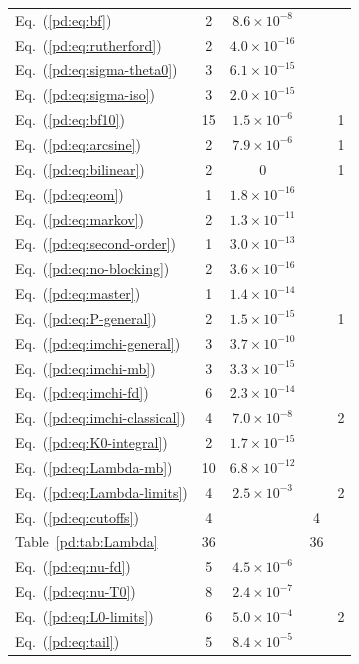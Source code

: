 \begin{longtable}{L{4.0cm}cccc}
Eq.~(\ref*{pd:eq:bf}) & 2 & $8.6\times10^{-8}$ &  & \\
Eq.~(\ref*{pd:eq:rutherford}) & 2 & $4.0\times10^{-16}$ &  & \\
Eq.~(\ref*{pd:eq:sigma-theta0}) & 3 & $6.1\times10^{-15}$ &  & \\
Eq.~(\ref*{pd:eq:sigma-iso}) & 3 & $2.0\times10^{-15}$ &  & \\
Eq.~(\ref*{pd:eq:bf10}) & 15 & $1.5\times10^{-6}$ &  & 1\\
Eq.~(\ref*{pd:eq:arcsine}) & 2 & $7.9\times10^{-6}$ &  & 1\\
Eq.~(\ref*{pd:eq:bilinear}) & 2 & $0$ &  & 1\\
Eq.~(\ref*{pd:eq:eom}) & 1 & $1.8\times10^{-16}$ &  & \\
Eq.~(\ref*{pd:eq:markov}) & 2 & $1.3\times10^{-11}$ &  & \\
Eq.~(\ref*{pd:eq:second-order}) & 1 & $3.0\times10^{-13}$ &  & \\
Eq.~(\ref*{pd:eq:no-blocking}) & 2 & $3.6\times10^{-16}$ &  & \\
Eq.~(\ref*{pd:eq:master}) & 1 & $1.4\times10^{-14}$ &  & \\
Eq.~(\ref*{pd:eq:P-general}) & 2 & $1.5\times10^{-15}$ &  & 1\\
Eq.~(\ref*{pd:eq:imchi-general}) & 3 & $3.7\times10^{-10}$ &  & \\
Eq.~(\ref*{pd:eq:imchi-mb}) & 3 & $3.3\times10^{-15}$ &  & \\
Eq.~(\ref*{pd:eq:imchi-fd}) & 6 & $2.3\times10^{-14}$ &  & \\
Eq.~(\ref*{pd:eq:imchi-classical}) & 4 & $7.0\times10^{-8}$ &  & 2\\
Eq.~(\ref*{pd:eq:K0-integral}) & 2 & $1.7\times10^{-15}$ &  & \\
Eq.~(\ref*{pd:eq:Lambda-mb}) & 10 & $6.8\times10^{-12}$ &  & \\
Eq.~(\ref*{pd:eq:Lambda-limits}) & 4 & $2.5\times10^{-3}$ &  & 2\\
Eq.~(\ref*{pd:eq:cutoffs}) & 4 &  & 4 & \\
Table~\ref*{pd:tab:Lambda} & 36 &  & 36 & \\
Eq.~(\ref*{pd:eq:nu-fd}) & 5 & $4.5\times10^{-6}$ &  & \\
Eq.~(\ref*{pd:eq:nu-T0}) & 8 & $2.4\times10^{-7}$ &  & \\
Eq.~(\ref*{pd:eq:L0-limits}) & 6 & $5.0\times10^{-4}$ &  & 2\\
Eq.~(\ref*{pd:eq:tail}) & 5 & $8.4\times10^{-5}$ &  & \\

\end{longtable}
